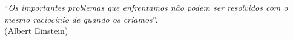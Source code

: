 \thispagestyle{empty}
\begin{center}
%
\end{center}
\vspace{21cm}

\begin{flushright}
``\emph{Os importantes problemas que enfrentamos não podem ser resolvidos com o
mesmo raciocínio de quando os criamos}''.  \\ (Albert Einstein)
\end{flushright}
